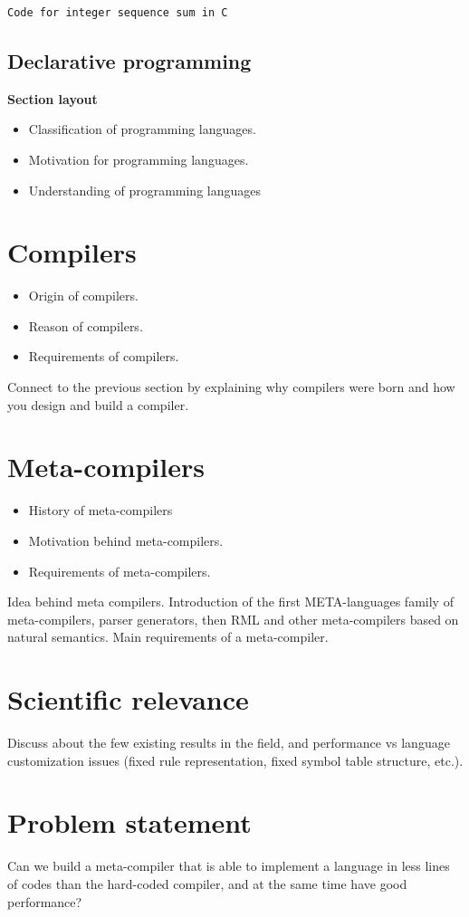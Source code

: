 \begin{lstlisting}[caption = C code to compute the sum of a sequence of numbers, label = lst:ch1_c_code]
Code for integer sequence sum in C
\end{lstlisting}

\subsection*{Declarative programming}

\textbf{Section layout}
\begin{itemize}[noitemsep]
	\item Classification of programming languages.
	\item Motivation for programming languages.
	\item Understanding of programming languages
\end{itemize}

\section{Compilers}
\begin{itemize}[noitemsep]
	\item Origin of compilers.
	\item Reason of compilers.
	\item Requirements of compilers.
\end{itemize}

Connect to the previous section by explaining why compilers were born and how you design and build a compiler.

\section{Meta-compilers}
\begin{itemize}[noitemsep]
	\item History of meta-compilers
	\item Motivation behind meta-compilers.
	\item Requirements of meta-compilers.
\end{itemize}
 Idea behind meta compilers. Introduction of the first META-languages family of meta-compilers, parser generators, then RML and other meta-compilers based on natural semantics. Main requirements of a meta-compiler.

\section{Scientific relevance}

Discuss about the few existing results in the field, and performance vs language customization issues (fixed rule representation, fixed symbol table structure, etc.).

\section{Problem statement}

Can we build a meta-compiler that is able to implement a language in less lines of codes than the hard-coded compiler, and at the same time have good performance?